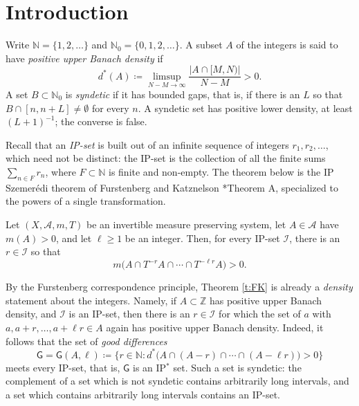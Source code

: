 \section{Introduction} 

Write $\mathbb N = \{1,2,\ldots\}$ and $\mathbb N_0 = \{0, 1,2,\ldots\}$. 
A subset $A$ of the integers is said to have \emph{positive upper Banach density} if 
\begin{equation}  \label{e:banach}
    d ^{\ast}(A) \coloneqq \limsup_{N-M\to\infty}  \frac{\lvert A\cap [M,N) \rvert} {N-M} >0. 
\end{equation} 
A set $B \subset \mathbb N_0$ is \emph{syndetic} if it has bounded gaps, that is, if there is an $L$ so that 
$B \cap [n, n+L] \neq \emptyset $ for every $n$.  A syndetic set has positive lower density, at least $(L+1) ^{-1}$; the converse is false.  

Recall that an \emph{IP-set} is built out of an infinite sequence of  
 integers $r_1  ,  r_2 ,\ldots $,  which need not be distinct: 
the IP-set is the collection of all the finite sums $ \sum_{n\in F} r_n $, 
where $F\subset \mathbb N$ is finite and non-empty.  
The theorem below is the IP Szemer\'edi theorem of Furstenberg and Katznelson 
\cite{FK85}*{Theorem A}, specialized to the powers of a single transformation.  

\begin{priorResults}  \label{t:FK}
    Let $(X, \mathcal A, m, T)$ be an invertible measure preserving system, let $A \in \mathcal A$ have $m(A)>0$, and let $\ell \geq 1$ be an integer. 
    Then, for every IP-set $\mathcal I$, there is an $r \in \mathcal I$ so that 
    \begin{equation}
        m\bigl(A \cap T ^{-r} A \cap \cdots \cap T ^{-\ell r} A \bigr) >0. 
    \end{equation}
\end{priorResults}

By the Furstenberg correspondence principle, Theorem \ref{t:FK} is already a \emph{density} statement about the integers.  
Namely, if $A \subset \mathbb Z$ has positive upper Banach density, and $\mathcal I$ is an IP-set, 
then there is an $r \in \mathcal I$ for which the set of $a$ with 
$a, a+r , \ldots, a+ \ell r \in A$ again has positive upper Banach density.  
Indeed, it follows that the set of \emph{good differences}
\begin{equation} \label{e:good}
\mathsf{G} = \mathsf{G}(A , \ell ) \coloneqq 
\bigl\{ r \in \mathbb N \colon d ^{\ast} \bigl( A \cap (A-r) \cap \cdots \cap (A - \ell r) \bigr) >0 \bigr\} 
\end{equation}
meets every IP-set, that is, $\mathsf G$ is an IP$^{\ast}$ set.  
Such a set is syndetic: the complement of a set which is not syndetic contains arbitrarily long intervals, and a set which contains arbitrarily long intervals contains an IP-set.  

